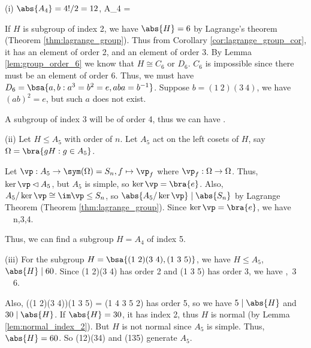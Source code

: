 \begin{solution}[\bf Solution.]
\ben
\item [(i)] $\abs{A_4} = 4!/2 = 12$,
\be
A_4 = 
\ee

If $H$ is subgroup of index 2, we have $\abs{H} = 6$ by Lagrange's theorem (Theorem \ref{thm:lagrange_group}). Thus from Corollary \ref{cor:lagrange_group_cor}, it has an element of order 2, and an element of order 3. By Lemma \ref{lem:group_order_6} we know that $H\cong C_6$ or $D_6$. $C_6$ is impossible since there must be an element of order 6. Thus, we must have $D_6 = \bsa{a,b:a^3 = b^2 = e, aba = b^{-1}}$. Suppose $b= (1\ 2)(3\ 4)$, we have $(ab)^2 = e$, but such $a$ does not exist.

A subgroup of index 3 will be of order 4, thus we can have
\be
{}.
\ee

\item [(ii)] Let $H\leq A_5$ with order of $n$. Let $A_5$ act on the left cosets of $H$, say $\Omega = \bra{gH:g\in A_5}$.

Let $\vp: A_5 \to \sym(\Omega) = S_n, f \mapsto \vp_f$ where $\vp_f:\Omega \to \Omega$. Thus, $\ker \vp \lhd A_5$, but $A_5$ is simple, so $\ker \vp = \bra{e}$. Also, $A_5/\ker\vp \cong \im\vp \leq S_n$, so $\abs{A_5/\ker \vp}\mid \abs{S_n}$ by Lagrange Theorem (Theorem \ref{thm:lagrange_group}). Since $\ker \vp = \bra{e}$, we have
\be
{}\mid {} \ \ra\ n,3,4.
\ee

Thus, we can find a subgroup $H = A_4$ of index 5.

\item [(iii)] For the subgroup $H = \bsa{(1\ 2)(3\ 4),(1\ 3\ 5)}$, we have $H \leq A_5$, $\abs{H}\mid 60$. Since (1 2)(3 4) has order 2 and (1 3 5) has order 3, we have
\mid {},\ 3\mid {} \ \ra \ 6\mid{}.
\ee

Also, ((1 2)(3 4))(1 3 5) = (1 4 3 5 2) has order 5, so we have $5\mid \abs{H}$ and $30\mid \abs{H}$. If $\abs{H} =30$, it has index 2, thus $H$ is normal (by Lemma \ref{lem:normal_index_2}). But $H$ is not normal since $A_5$ is simple. Thus, $\abs{H} = 60$. So (12)(34) and (135) generate $A_5$.
\een
\end{solution}

